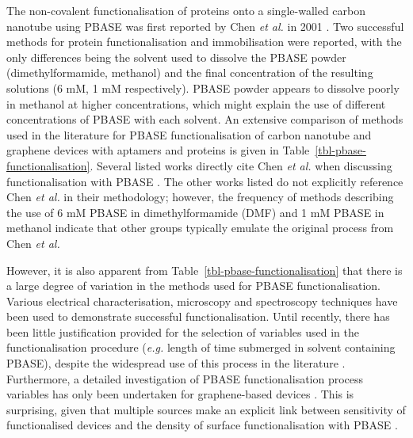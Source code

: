 \documentclass[
  a4paper,
]{scrbook}
\begin{document}
The non-covalent functionalisation of proteins onto a single-walled
carbon nanotube using PBASE was first reported by Chen \emph{et al.} in
2001 \autocite{Chen2001}. Two successful methods for protein
functionalisation and immobilisation were reported, with the only
differences being the solvent used to dissolve the PBASE powder
(dimethylformamide, methanol) and the final concentration of the
resulting solutions (6 mM, 1 mM respectively). PBASE powder appears to
dissolve poorly in methanol at higher concentrations, which might
explain the use of different concentrations of PBASE with each solvent.
An extensive comparison of methods used in the literature for PBASE
functionalisation of carbon nanotube and graphene devices with aptamers
and proteins is given in Table~\ref{tbl-pbase-functionalisation}.
Several listed works directly cite Chen \emph{et al.} when discussing
functionalisation with PBASE \autocite{Cella2010,Ohno2010,Zheng2016}.
The other works listed do not explicitly reference Chen \emph{et al.} in
their methodology; however, the frequency of methods describing the use
of 6 mM PBASE in dimethylformamide (DMF) and 1 mM PBASE in methanol
indicate that other groups typically emulate the original process from
Chen \emph{et al.}

However, it is also apparent from
Table~\ref{tbl-pbase-functionalisation} that there is a large degree of
variation in the methods used for PBASE functionalisation. Various
electrical characterisation, microscopy and spectroscopy techniques have
been used to demonstrate successful functionalisation. Until recently,
there has been little justification provided for the selection of
variables used in the functionalisation procedure (\emph{e.g.} length of
time submerged in solvent containing PBASE), despite the widespread use
of this process in the literature
\autocite{Hinnemo2017,Zhen2018,Wang2020}. Furthermore, a detailed
investigation of PBASE functionalisation process variables has only been
undertaken for graphene-based devices
\autocite{Zhen2018,Hao2020,Wang2020,Mishyn2022}. This is surprising,
given that multiple sources make an explicit link between sensitivity of
functionalised devices and the density of surface functionalisation with
PBASE \autocite{White2008,Hermanson2013-3,Chen2014}.
\end{document}

